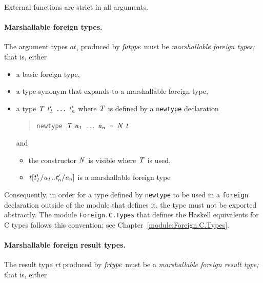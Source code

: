 External functions are strict in all arguments.

\paragraph{Marshallable foreign types.}

The argument types \(\textit{at}_i\) produced by \mbox{$\it fatype$} must be
\emph{marshallable foreign types;} that is, either

\begin{itemize}
\item a basic foreign type,

\item a type synonym that expands to a marshallable foreign type,

\item a type \mbox{$\it T\ t'_1\ \ldots \ t'_n$} where \mbox{$\it T$} is defined by a \mbox{\tt newtype} declaration

\begin{quote}
\mbox{\tt newtype\ }\mbox{$\it T\ a_1\ \ldots \ a_n$}\mbox{\tt \ =\ }\mbox{$\it N\ t$}
\end{quote}

and

\begin{itemize}
\item the constructor \mbox{$\it N$} is visible where \mbox{$\it T$} is used,

\item \mbox{$\it t[t'_1/a_1..t'_n/a_n]$} is a marshallable foreign type
\end{itemize}
\end{itemize}

Consequently, in order for a type defined by \mbox{\tt newtype} to be used in a
\mbox{\tt foreign} declaration outside of the module that defines it, the type
must not be exported abstractly.  The module \mbox{\tt Foreign.C.Types} that
defines the Haskell equivalents for C types follows this convention;
see Chapter~\ref{module:Foreign.C.Types}.

\paragraph{Marshallable foreign result types.}

The result type \textit{rt} produced by \mbox{$\it frtype$} must be a
\emph{marshallable foreign result type;} that is, either

